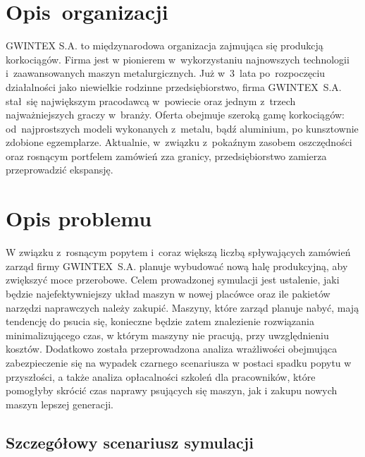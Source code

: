 \documentclass[12pt, a4paper, oneside]{mwart} %
\begin{document}
\section{Opis~organizacji}
GWINTEX S.A. to międzynarodowa organizacja zajmująca się produkcją korkociągów. Firma jest w pionierem w~wykorzystaniu najnowszych technologii i~zaawansowanych maszyn metalurgicznych. Już w~3~lata po~rozpoczęciu działalności jako niewielkie rodzinne przedsiębiorstwo, firma GWINTEX~S.A. stał~się największym pracodawcą w~powiecie oraz jednym z~trzech najważniejszych graczy w~branży. Oferta obejmuje szeroką gamę korkociągów: od~najprostszych modeli wykonanych z~metalu, bądź aluminium, po kunsztownie zdobione egzemplarze. Aktualnie, w~związku z~pokaźnym zasobem oszczędności oraz rosnącym portfelem zamówień zza granicy, przedsiębiorstwo zamierza przeprowadzić ekspansję.

\section{Opis problemu}
W związku z~rosnącym popytem i~coraz większą liczbą spływających zamówień zarząd firmy GWINTEX~S.A. planuje wybudować nową halę produkcyjną, aby zwiększyć moce przerobowe. Celem prowadzonej symulacji jest ustalenie, jaki będzie najefektywniejszy układ maszyn w nowej placówce oraz ile pakietów narzędzi naprawczych należy zakupić. Maszyny, które zarząd planuje nabyć, mają tendencję do psucia się, konieczne będzie zatem znalezienie rozwiązania minimalizującego czas, w którym maszyny nie pracują, przy uwzględnieniu kosztów. Dodatkowo została przeprowadzona analiza wrażliwości obejmująca zabezpieczenie się na wypadek czarnego scenariusza w postaci spadku popytu w przyszłości, a także analiza opłacalności szkoleń dla pracowników, które pomogłyby skrócić czas naprawy psujących się maszyn, jak i zakupu nowych maszyn lepszej generacji.

\subsection{Szczegółowy scenariusz symulacji}
\end{document}
